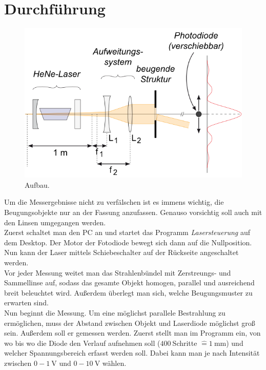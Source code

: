\documentclass[12pt,a4paper,titlepage,headinclude,bibtotoc]{scrartcl}
\newcommand{\corresponds}{\ensuremath{\mathrel{\widehat{=}}}}
\begin{document}
\section{Durchführung}
\label{sec:durchfuehrung}
\begin{figure}[!h]
	\centering
	\includegraphics[scale=0.7]{Aufbau.png}
	\caption{Aufbau. \cite[Datum: 02.01.15]{LP21}}
\end{figure}

Um die Messergebnisse nicht zu verfälschen ist es immens wichtig, die Beugungsobjekte nur an der Fassung anzufassen.
Genauso vorsichtig soll auch mit den Linsen umgegangen werden.\\

Zuerst schaltet man den PC an und startet das Programm \emph{Lasersteuerung} auf dem Desktop.
Der Motor der Fotodiode bewegt sich dann auf die Nullposition.
Nun kann der Laser mittels Schiebeschalter auf der Rückseite angeschaltet werden.\\

Vor jeder Messung weitet man das Strahlenbündel mit Zerstreungs- und Sammellinse auf, sodass das gesamte Objekt homogen, parallel und ausreichend breit beleuchtet wird.
Außerdem überlegt man sich, welche Beugungsmuster zu erwarten sind.\\

Nun beginnt die Messung.
Um eine möglichst parallele Bestrahlung zu ermöglichen, muss der Abstand zwischen Objekt und Laserdiode möglichst groß sein.
Außerdem soll er gemessen werden.
Zuerst stellt man im Programm ein, von wo bis wo die Diode den Verlauf aufnehmen soll ($400~$Schritte $\corresponds 1~$mm) und welcher Spannungsbereich erfasst werden soll.
Dabei kann man je nach Intensität zwischen $0-1~$V und $0-10~$V wählen.
\end{document}
